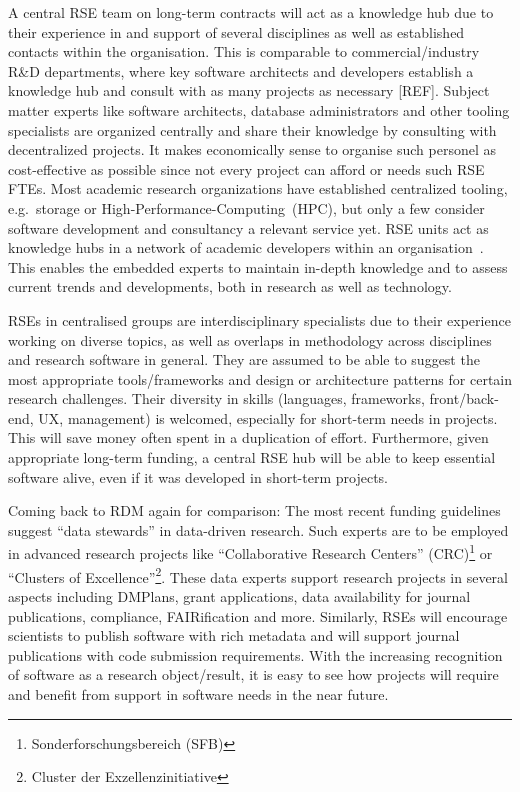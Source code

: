 \documentclass[a4paper]{article}
\begin{document}
A central RSE team on long-term contracts will act as a knowledge hub due to their experience in and support of several disciplines as well as established contacts within the organisation.
This is comparable to commercial/industry R\&D departments, where key software architects and developers establish a knowledge hub and consult with as many projects as necessary [REF].
Subject matter experts like software architects, database administrators and other tooling specialists are organized centrally and share their knowledge by consulting with decentralized projects.
It makes economically sense to organise such personel as cost-effective as possible since not every project can afford or needs such RSE FTEs.
Most academic research organizations have established centralized tooling, e.g.\ storage or High-Performance-Computing\ (HPC), but only a few consider software development and consultancy a relevant service yet.
RSE units act as knowledge hubs in a network of academic developers within an organisation~\autocite{Elsholz2006}.
This enables the embedded experts to maintain in-depth knowledge and to assess current trends and developments, both in research as well as technology.

RSEs in centralised groups are interdisciplinary specialists due to their experience working on diverse topics, as well as overlaps in methodology across disciplines and research software in general.
They are assumed to be able to suggest the most appropriate tools/frameworks and design or architecture patterns for certain research challenges.
Their diversity in skills (languages, frameworks, front/back-end, UX, management) is welcomed, especially for short-term needs in projects.
This will save money often spent in a duplication of effort.
Furthermore, given appropriate long-term funding, a central RSE hub will be able to keep essential software alive, even if it was developed in short-term projects.


Coming back to RDM again for comparison: The most recent funding guidelines suggest “data stewards” in data-driven research.
Such experts are to be employed in advanced research projects like “Collaborative Research Centers” (CRC)\footnote{Sonderforschungsbereich (SFB)} or “Clusters of Excellence”\footnote{Cluster der Exzellenzinitiative}.
These data experts support research projects in several aspects including DMPlans, grant applications, data availability for journal publications, compliance, FAIRification and more.
Similarly, RSEs will encourage scientists to publish software with rich metadata and will support journal publications with code submission requirements.
With the increasing recognition of software as a research object/result, it is easy to see how projects will require and benefit from support in software needs in the near future.
\end{document}
